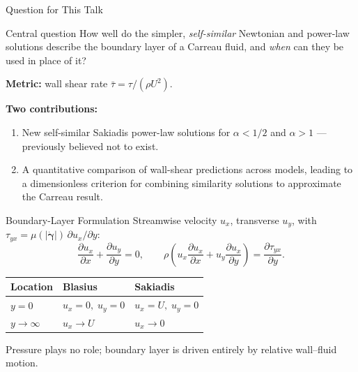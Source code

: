 \documentclass[10pt,aspectratio=169]{beamer}
\newcommand{\gd}{{\dot{\bm{\gamma}}}}
\begin{document}
\begin{frame}{Question for This Talk}
  \begin{block}{Central question}
    How well do the simpler, \emph{self-similar} Newtonian and power-law solutions
    describe the boundary layer of a Carreau fluid, and \emph{when} can they be used in place of it?
  \end{block}
  \vspace{0.5em}
  \textbf{Metric:} wall shear rate $\bar\tau = \tau/(\rho U^2)$.
  \vspace{0.5em}

  \textbf{Two contributions:}
  \begin{enumerate}
    \item New self-similar Sakiadis power-law solutions for $\alpha<1/2$ and $\alpha>1$ ---
          previously believed not to exist.
    \item A quantitative comparison of wall-shear predictions across models, leading to a
          dimensionless criterion for combining similarity solutions to approximate the Carreau result.
  \end{enumerate}
\end{frame}

\begin{frame}{Boundary-Layer Formulation}
  Streamwise velocity $u_x$, transverse $u_y$, with $\tau_{yx}=\mu(|\gd|)\,\partial u_x/\partial y$:
  \[
    \frac{\partial u_x}{\partial x} + \frac{\partial u_y}{\partial y}=0,\qquad
    \rho\!\left(u_x\frac{\partial u_x}{\partial x} + u_y\frac{\partial u_x}{\partial y}\right) = \frac{\partial \tau_{yx}}{\partial y}.
  \]
  \vspace{0.3em}

  \begin{center}
  \begin{tabular}{lll}
    \toprule
    Location & Blasius & Sakiadis \\
    \midrule
    $y=0$         & $u_x=0,\; u_y=0$ & $u_x=U,\; u_y=0$ \\
    $y\to\infty$  & $u_x\to U$       & $u_x\to 0$       \\
    \bottomrule
  \end{tabular}
  \end{center}
  \vspace{0.5em}

  Pressure plays no role; boundary layer is driven entirely by relative wall--fluid motion.
\end{frame}
\end{document}
